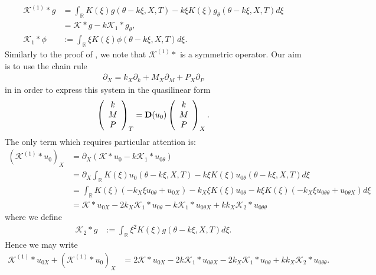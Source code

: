 \documentclass[11pt,leqno]{article}
\numberwithin{equation}{section}
\newcommand{\R}{\mathbb R}
\newcommand\nn{\nonumber}
\theoremstyle{definition}
\begin{document}
\begin{align}
	\mathcal{K}^{(1)}*g &= \int_{\R}K(\xi)g(\theta - k\xi,X,T) - k\xi K(\xi)g_{\theta}(\theta - k\xi,X,T)d\xi\nn\\
	&= \mathcal{K}*g - k\mathcal{K}_{1}*g_{\theta},\nn\\
	\mathcal{K}_{1}*\phi &:= \int_{\R}\xi K(\xi)\phi(\theta-k\xi,X,T)d\xi. \label{eq:K_1}
\end{align}
Similarly to the proof of , we note that $\mathcal{K}^{(1)}*$ is a symmetric operator. Our aim is to use the chain rule
\begin{align}
	\partial_{X} = k_{X}\partial_{k} + M_{X}\partial_{M} + P_{X}\partial_{P} \label{eq:chainrule}
\end{align}
in  in order to express this system in the quasilinear form
\begin{equation}\label{e:whitmod_quasilinear}
\left(\begin{array}{c}
    k \\
    M \\
    P
\end{array}\right)_T = {\bf D}(u_0)
\left(\begin{array}{c}
    k \\
    M \\
    P
\end{array}\right)_X.
\end{equation}
The only term which requires particular attention is:
\begin{align*}
	(\mathcal{K}^{(1)}*u_{0})_{X} &= \partial_{X}\left(\mathcal{K}*u_{0} - k\mathcal{K}_{1}*u_{0\theta}\right)\\
	&= \partial_{X}\int_{\R}K(\xi)u_{0}(\theta - k\xi,X,T) - k\xi K(\xi)u_{0\theta}(\theta - k\xi,X,T)d\xi\\
	&= \int_{\R}K(\xi)\left(-k_{X}\xi u_{0\theta} + u_{0X}\right) - k_{X}\xi K(\xi)u_{0\theta} - k\xi K(\xi)\left(-k_{X}\xi u_{0\theta\theta} + u_{0\theta X}\right)d\xi\\
	&= \mathcal{K}*u_{0X} - 2k_{X}\mathcal{K}_{1}*u_{0\theta} - k\mathcal{K}_{1}*u_{0\theta X}+ kk_{X}\mathcal{K}_{2}*u_{0\theta\theta}
\end{align*}
where we define
\begin{align}
	\mathcal{K}_{2}*g &:= \int_{\R}\xi^{2}K(\xi)g(\theta - k\xi,X,T)d\xi.\label{eq:K_2}
\end{align}
Hence we may write
\begin{align*}
	\mathcal{K}^{(1)}*u_{0X} + (\mathcal{K}^{(1)}*u_{0})_{X} &= 2\mathcal{K}*u_{0X} - 2k\mathcal{K}_{1}*u_{0\theta X} - 2k_{X}\mathcal{K}_{1}*u_{0\theta} + kk_{X}\mathcal{K}_{2}*u_{0\theta\theta}.
\end{align*}
\end{document}
